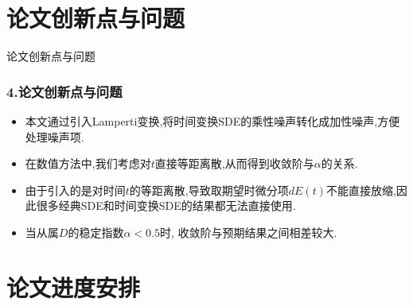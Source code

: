 \documentclass[notheorems,10pt,compress]{beamer}
\numberwithin{figure}{section}
\numberwithin{table}{section}
\numberwithin{equation}{section}
\numberwithin{theorem}{section}
\numberwithin{definition}{section}
\numberwithin{lemma}{section}
\numberwithin{proposition}{section}
\numberwithin{corollary}{section}
\theoremstyle{example}
\begin{document}
	
%		
	\section{论文创新点与问题}
	
	
	\begin{frame}{论文创新点与问题}
		\frametitle{4.论文创新点与问题}
		\begin{block}{}
			\vskip 6pt
			\begin{itemize}
				\setlength{\itemsep}{6pt}
				\item 本文通过引入Lamperti变换,将时间变换SDE的乘性噪声转化成加性噪声,方便处理噪声项.
				\item 在数值方法中,我们考虑对$t$直接等距离散,从而得到收敛阶与$\alpha$的关系.
				\item 由于引入的是对时间$t$的等距离散,导致取期望时微分项$dE(t)$不能直接放缩,因此很多经典SDE和时间变换SDE的结果都无法直接使用.
				\item 当从属$D$的稳定指数$\alpha < 0.5$时, 收敛阶与预期结果之间相差较大.
			\end{itemize}
		\end{block}
	\end{frame}
	
	\section{论文进度安排}
	
	
	
\end{document}
